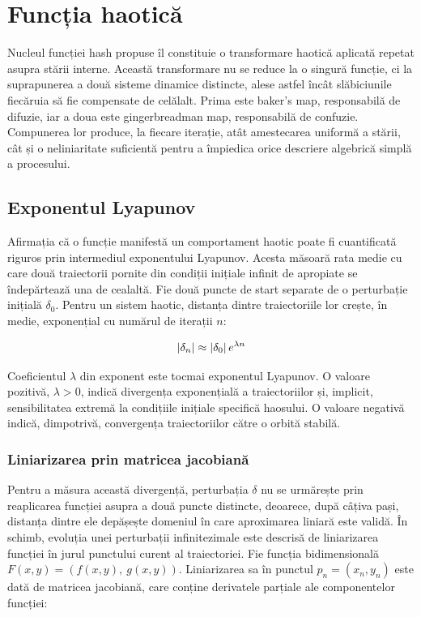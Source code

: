 \section{Funcția haotică}

Nucleul funcției hash propuse îl constituie o transformare haotică aplicată repetat asupra stării interne.
Această transformare nu se reduce la o singură funcție, ci la suprapunerea a două sisteme dinamice distincte, alese astfel încât slăbiciunile fiecăruia să fie compensate de celălalt.
Prima este baker's map, responsabilă de difuzie, iar a doua este gingerbreadman map, responsabilă de confuzie.
Compunerea lor produce, la fiecare iterație, atât amestecarea uniformă a stării, cât și o neliniaritate suficientă pentru a împiedica orice descriere algebrică simplă a procesului. \\

\subsection{Exponentul Lyapunov}

Afirmația că o funcție manifestă un comportament haotic poate fi cuantificată riguros prin intermediul exponentului Lyapunov.
Acesta măsoară rata medie cu care două traiectorii pornite din condiții inițiale infinit de apropiate se îndepărtează una de cealaltă.
Fie două puncte de start separate de o perturbație inițială $\delta_0$.
Pentru un sistem haotic, distanța dintre traiectoriile lor crește, în medie, exponențial cu numărul de iterații $n$:

\begin{equation}
    \lvert\delta_n\rvert \approx \lvert\delta_0\rvert \, e^{\lambda n}
\end{equation}

Coeficientul $\lambda$ din exponent este tocmai exponentul Lyapunov.
O valoare pozitivă, $\lambda > 0$, indică divergența exponențială a traiectoriilor și, implicit, sensibilitatea extremă la condițiile inițiale specifică haosului.
O valoare negativă indică, dimpotrivă, convergența traiectoriilor către o orbită stabilă. \\

\subsubsection{Liniarizarea prin matricea jacobiană}

Pentru a măsura această divergență, perturbația $\delta$ nu se urmărește prin reaplicarea funcției asupra a două puncte distincte, deoarece, după câțiva pași, distanța dintre ele depășește domeniul în care aproximarea liniară este validă.
În schimb, evoluția unei perturbații infinitezimale este descrisă de liniarizarea funcției în jurul punctului curent al traiectoriei.
Fie funcția bidimensională $F(x, y) = \left( f(x, y),\ g(x, y) \right)$.
Liniarizarea sa în punctul $p_n = (x_n, y_n)$ este dată de matricea jacobiană, care conține derivatele parțiale ale componentelor funcției:

